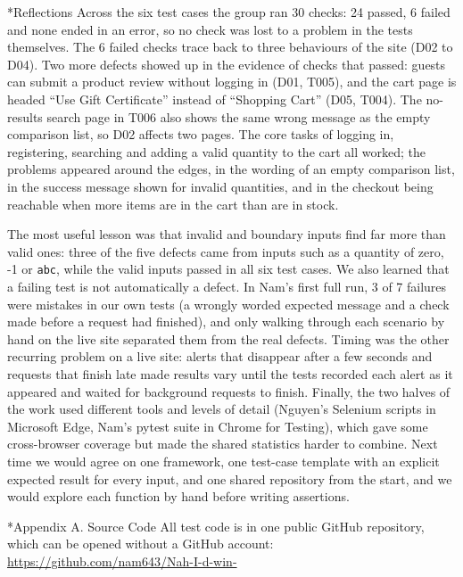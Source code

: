 \documentclass[11pt,a4paper]{article}
\makeatletter
\renewcommand\section{\@startsection{section}{1}{0pt}{3ex plus 1ex}{1.2ex}{\LARGE\bfseries}}
\renewcommand\subsection{\@startsection{subsection}{2}{0pt}{2ex plus .5ex}{.8ex}{\Large\bfseries}}
\makeatother
\begin{document}
\subsection*{Reflections}
Across the six test cases the group ran 30 checks: 24 passed, 6 failed and none ended in an error, so no check was lost to a problem in the tests themselves. The 6 failed checks trace back to three behaviours of the site (D02 to D04). Two more defects showed up in the evidence of checks that passed: guests can submit a product review without logging in (D01, T005), and the cart page is headed ``Use Gift Certificate'' instead of ``Shopping Cart'' (D05, T004). The no-results search page in T006 also shows the same wrong message as the empty comparison list, so D02 affects two pages. The core tasks of logging in, registering, searching and adding a valid quantity to the cart all worked; the problems appeared around the edges, in the wording of an empty comparison list, in the success message shown for invalid quantities, and in the checkout being reachable when more items are in the cart than are in stock.

The most useful lesson was that invalid and boundary inputs find far more than valid ones: three of the five defects came from inputs such as a quantity of zero, -1 or \texttt{abc}, while the valid inputs passed in all six test cases. We also learned that a failing test is not automatically a defect. In Nam's first full run, 3 of 7 failures were mistakes in our own tests (a wrongly worded expected message and a check made before a request had finished), and only walking through each scenario by hand on the live site separated them from the real defects. Timing was the other recurring problem on a live site: alerts that disappear after a few seconds and requests that finish late made results vary until the tests recorded each alert as it appeared and waited for background requests to finish. Finally, the two halves of the work used different tools and levels of detail (Nguyen's Selenium scripts in Microsoft Edge, Nam's pytest suite in Chrome for Testing), which gave some cross-browser coverage but made the shared statistics harder to combine. Next time we would agree on one framework, one test-case template with an explicit expected result for every input, and one shared repository from the start, and we would explore each function by hand before writing assertions.



\clearpage
\section*{Appendix A. Source Code}
All test code is in one public GitHub repository, which can be opened without a GitHub account:\newline
\url{https://github.com/nam643/Nah-I-d-win-}
\end{document}
